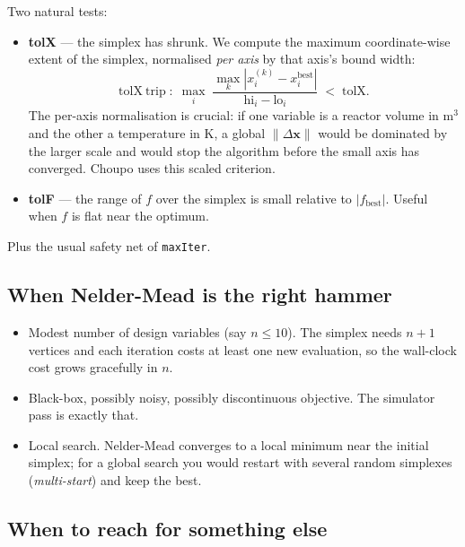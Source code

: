 \documentclass[11pt,a4paper]{article}
\newcommand{\xv}{\mathbf{x}}
\begin{document}
Two natural tests:
\begin{itemize}
    \item \textbf{tolX} --- the simplex has shrunk.  We compute the
          maximum coordinate-wise extent of the simplex, normalised
          \emph{per axis} by that axis's bound width:
          \[
              \mathrm{tolX\ trip} \;:\;
              \max_i \;
              \frac{\max_k |x^{(k)}_i - x^{\mathrm{best}}_i|}
                   {\mathrm{hi}_i - \mathrm{lo}_i}
              \;<\; \mathrm{tolX}.
          \]
          The per-axis normalisation is crucial: if one variable is a
          reactor volume in $\mathrm{m^3}$ and the other a temperature
          in K, a global $\|\Delta \xv\|$ would be dominated by the
          larger scale and would stop the algorithm before the small
          axis has converged.  Choupo uses this scaled criterion.
    \item \textbf{tolF} --- the range of $f$ over the simplex is small
          relative to $|f_{\mathrm{best}}|$.  Useful when $f$ is flat
          near the optimum.
\end{itemize}
Plus the usual safety net of \texttt{maxIter}.

\subsection*{When Nelder-Mead is the right hammer}

\begin{itemize}
    \item Modest number of design variables (say $n \le 10$).  The
          simplex needs $n+1$ vertices and each iteration costs at
          least one new evaluation, so the wall-clock cost grows
          gracefully in $n$.
    \item Black-box, possibly noisy, possibly discontinuous objective.
          The simulator pass is exactly that.
    \item Local search.  Nelder-Mead converges to a local minimum near
          the initial simplex; for a global search you would restart
          with several random simplexes (\emph{multi-start}) and keep
          the best.
\end{itemize}

\subsection*{When to reach for something else}
\end{document}
